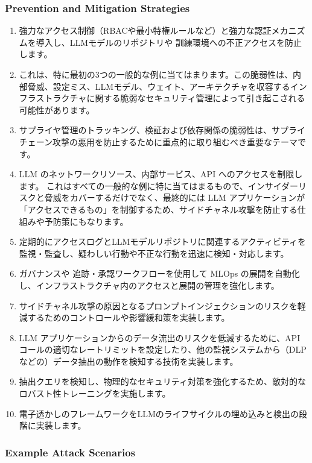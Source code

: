 \documentclass[
]{article}
\providecommand{\tightlist}{%
  \setlength{\itemsep}{0pt}\setlength{\parskip}{0pt}}
\begin{document}
\subsubsection{Prevention and Mitigation
Strategies}\label{prevention-and-mitigation-strategies}

\begin{enumerate}
\def\labelenumi{\arabic{enumi}.}
\tightlist
\item
  強力なアクセス制御（RBACや最小特権ルールなど）と強力な認証メカニズムを導入し、LLMモデルのリポジトリや
  訓練環境への不正アクセスを防止します。
\item
  これは、特に最初の3つの一般的な例に当てはまります。この脆弱性は、内部脅威、設定ミス、LLMモデル、ウェイト、アーキテクチャを収容するインフラストラクチャに関する脆弱なセキュリティ管理によって引き起こされる可能性があります。
\item
  サプライヤ管理のトラッキング、検証および依存関係の脆弱性は、サプライチェーン攻撃の悪用を防止するために重点的に取り組むべき重要なテーマです。
\item
  LLM のネットワークリソース、内部サービス、API
  へのアクセスを制限します。
  これはすべての一般的な例に特に当てはまるもので、インサイダーリスクと脅威をカバーするだけでなく、最終的には
  LLM
  アプリケーションが「アクセスできるもの」を制御するため、サイドチャネル攻撃を防止する仕組みや予防策にもなります。
\item
  定期的にアクセスログとLLMモデルリポジトリに関連するアクティビティを監視・監査し、疑わしい行動や不正な行動を迅速に検知・対応します。
\item
  ガバナンスや 追跡・承認ワークフローを使用して MLOps
  の展開を自動化し、インフラストラクチャ内のアクセスと展開の管理を強化します。
\item
  サイドチャネル攻撃の原因となるプロンプトインジェクションのリスクを軽減するためのコントロールや影響緩和策を実装します。
\item
  LLM アプリケーションからのデータ流出のリスクを低減するために、API
  コールの適切なレートリミットを設定したり、他の監視システムから（DLP
  などの）データ抽出の動作を検知する技術を実装します。
\item
  抽出クエリを検知し、物理的なセキュリティ対策を強化するため、敵対的なロバスト性トレーニングを実施します。
\item
  電子透かしのフレームワークをLLMのライフサイクルの埋め込みと検出の段階に実装します。
\end{enumerate}

\subsubsection{Example Attack Scenarios}\label{example-attack-scenarios}
\end{document}
